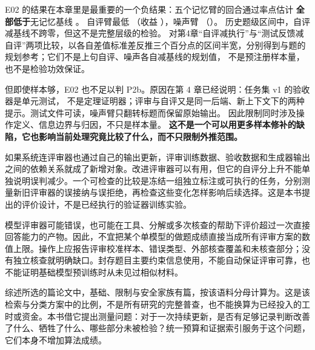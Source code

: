 \begin{sloppypar}
E02 的结果在本章里是最重要的一个负结果：五个记忆臂的回合通过率点估计 \textbf{全部低于}无记忆基线 。
自评臂最低 （收益 ），噪声臂 （）。
历史题级区间中，自评减基线不跨零，但这不是完整层级的检验。
对第4章“自评减执行”与“测试反馈减自评”两项比较，以各自差值标准差反推三个百分点的区间半宽，分别得到与题的规划参考；它们不是上句自评、噪声各自减基线的规划值，
不是预注册样本量，也不是检验功效保证。
\end{sloppypar}

\begin{sloppypar}
但即使样本够，E02 也不足以判 P2b。原因在第 4 章已经说明：任务集 v1 的验收器是单元测试，
不是定理证明器；评审与自评又是同一后端、新上下文下的两种提示。测试文件可读，噪声臂只翻转标题而保留原始输出。
因此限制同时涉及操作定义、信息边界与归因，不只是样本量。
\textbf{这不是一个可以用更多样本修补的缺陷，它也影响当前处理究竟比较了什么，而不只限制外推范围。}
\end{sloppypar}

\begin{sloppypar}
如果系统连评审器也通过自己的输出更新，评审训练数据、验收数据和生成器输出之间的依赖关系就成了新增对象。改进评审器可以有用，但它的自评分上升不能单独说明误判减少。一个可检查的比较是冻结一组独立标注或可执行的任务，分别测量新旧评审器的误接纳与误拒绝，再检查这些变化怎样影响后续选择。这是本书提出的评价设计，不是已经执行的验证器训练实验。

\end{sloppypar}

\begin{sloppypar}
模型评审器可能错误，也可能在工具、分解或多次核查的帮助下评价超过一次直接回答能力的产物。因此，不宜把某个单模型的做题成绩直接当成所有评审方案的数值上限。操作上应报告评审校准样本、错误类型、外部核查覆盖和未核查部分；没有独立核查就明确缺口。封存题目主要约束信息使用，不能自动保证评审可靠，也不能证明基础模型预训练时从未见过相似材料。

\end{sloppypar}

\begin{principlebox}
综述\cite{rsi-survey-2607}所选的篇论文中，基础、限制与安全家族有篇，按该语料分母计算为。这是该检索与分类方案中的比例，不是所有研究的完整普查，也不能换算为已经投入的工时或资金。本书借它提出测量问题：对于一次持续更新，是否有足够记录判断改善了什么、牺牲了什么、哪些部分未被检验？统一预算和证据索引服务于这个问题，它们本身不增加算法成绩。

\end{principlebox}

